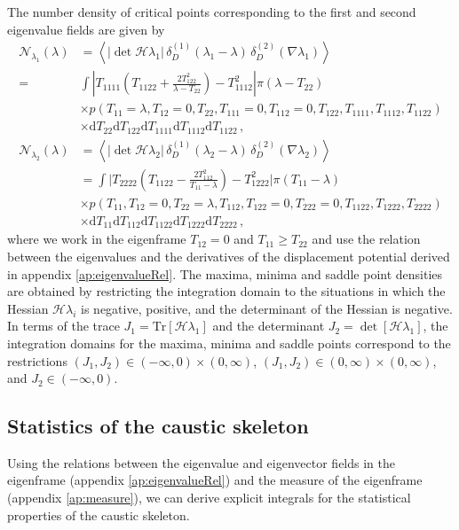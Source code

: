 \documentclass[a4paper, 11pt]{article}
\begin{document}
The number density of critical points corresponding to the first and second eigenvalue fields are given by
\begin{align}
\mathcal{N}_{\lambda_1}(\lambda) 
&= \left \langle 
|\det \mathcal{H} \lambda_1 |\, \delta_D^{(1)}(\lambda_1 - \lambda)\, \delta_D^{(2)}(\nabla \lambda_1)
\right \rangle\nonumber\\
=&\int  
\left|
T_{1111}\left(T_{1122}+\frac{2T_{122}^2}{\lambda-T_{22}}\right)-T_{1112}^2
\right|\pi(\lambda-T_{22})\nonumber\\
&\times p(T_{11}=\lambda, T_{12}=0,T_{22},T_{111}=0,T_{112}=0,T_{122},T_{1111},T_{1112},T_{1122})\nonumber\\
&\times \mathrm{d}T_{22}\mathrm{d}T_{122}\mathrm{d}T_{1111}\mathrm{d}T_{1112}\mathrm{d}T_{1122}\,,\\
\mathcal{N}_{\lambda_2}(\lambda) 
&= \left \langle 
|\det \mathcal{H} \lambda_2 |\, \delta_D^{(1)}(\lambda_2 - \lambda)\, \delta_D^{(2)}(\nabla \lambda_2)
\right \rangle\nonumber\\
&= \int \bigg|
T_{2222}\left(T_{1122} - \frac{2 T_{112}^2}{T_{11}-\lambda}\right)
-T_{1222} ^2
 \bigg| \pi (T_{11}-\lambda)\nonumber\\
 &\times p(T_{11},T_{12}=0, T_{22}=\lambda, T_{112},T_{122}=0,T_{222}=0,T_{1122},T_{1222},T_{2222})\nonumber\\
 &\times \mathrm{d}T_{11}\mathrm{d}T_{112}\mathrm{d}T_{1122}\mathrm{d}T_{1222}\mathrm{d}T_{2222}\,,
\end{align}
where we work in the eigenframe $T_{12}=0$ and $T_{11} \geq T_{22}$ and use the relation between the eigenvalues and the derivatives of the displacement potential derived in appendix \ref{ap:eigenvalueRel}. The maxima, minima and saddle point densities are obtained by restricting the integration domain to the situations in which the Hessian $\mathcal{H}\lambda_i$ is negative, positive, and the determinant of the Hessian is negative. In terms of the trace $J_1 = \text{Tr}[ \mathcal{H}\lambda_1]$ and the determinant $J_2=\det [\mathcal{H}\lambda_1]$, the integration domains for the maxima, minima and saddle points correspond to the restrictions $(J_1,J_2) \in (-\infty,0)\times (0,\infty)$, $(J_1,J_2) \in (0,\infty)\times (0,\infty)$, and $J_2 \in (-\infty,0)$.


\subsection{Statistics of the caustic skeleton}
Using the relations between the eigenvalue and eigenvector fields in the eigenframe (appendix \ref{ap:eigenvalueRel}) and the measure of the eigenframe  (appendix \ref{ap:measure}), we can derive explicit integrals for the statistical properties of the caustic skeleton.
\end{document}
